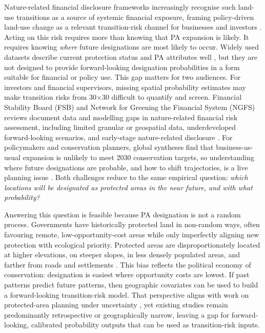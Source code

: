 \documentclass[12pt]{article}
\theoremstyle{break}
\begin{document}
Nature-related financial disclosure frameworks increasingly recognise such land-use
transitions as a source of systemic financial exposure, framing policy-driven
land-use change as a relevant transition-risk channel for businesses and investors
\citep{tnfd2023, govind2025}. Acting on this risk requires more than knowing that PA
expansion is likely. It requires knowing \emph{where} future designations are most
likely to occur. Widely used datasets describe current protection status and PA
attributes well \citep{wdpa, bingham2019}, but they are not designed to provide
forward-looking designation probabilities in a form suitable for
financial or policy use. This gap matters for two audiences. For investors and
financial supervisors, missing spatial probability estimates may make transition
risks from 30$\times$30 difficult to quantify and screen.
Financial Stability Board (FSB) and Network for Greening the Financial System (NGFS) reviews document data and modelling gaps in nature-related financial
risk assessment, including limited granular or geospatial data, underdeveloped
forward-looking scenarios, and early-stage nature-related disclosure
\citep{fsb2024, ngfs2023}.
For policymakers and conservation planners, global syntheses find that
business-as-usual expansion is unlikely to meet 2030 conservation targets, so understanding
where future designations are probable, and how to shift trajectories, is a live planning
issue \citep{palomo2025}.
Both challenges reduce to the same empirical question: \emph{which locations will be
designated as protected areas in the near future, and with what probability?}

Answering this question is feasible because PA designation is not a random process.
Governments have historically protected land in non-random ways, often favouring
remote, low-opportunity-cost areas while only imperfectly aligning new protection
with ecological priority. Protected areas are disproportionately located at higher
elevations, on steeper slopes, in less densely populated areas, and farther from roads
and settlements \citep{joppa2009, venter2018, baldi2017}. This bias reflects the
political economy of conservation: designation is easiest where opportunity costs are
lowest. If past patterns predict future patterns, then geographic covariates can be
used to build a forward-looking transition-risk model. That perspective aligns with
work on protected-area planning under uncertainty \citep{schuster2023}, yet existing
studies remain predominantly retrospective or geographically narrow, leaving a gap
for forward-looking, calibrated probability outputs that can be used as
transition-risk inputs.
\end{document}
